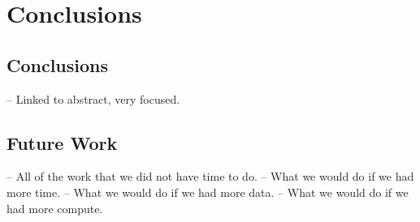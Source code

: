 \chapter{Conclusions}\label{chap:conclusions}

\section{Conclusions}\label{sec:conclusions}
-- Linked to abstract, very focused.

\section{Future Work}\label{sec:future-work}
-- All of the work that we did not have time to do.
-- What we would do if we had more time.
-- What we would do if we had more data.
-- What we would do if we had more compute.